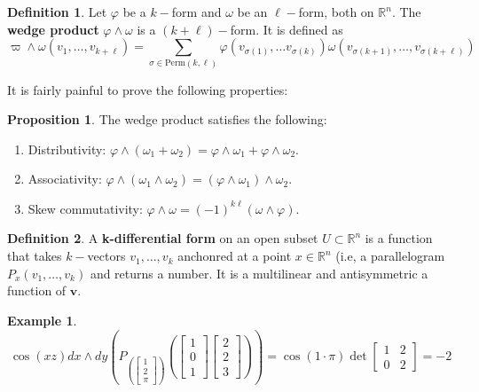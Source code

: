 \documentclass[10pt, oneside]{article}
\newcommand{\bbR}{\mathbb{R}}
\theoremstyle{definition}
\newtheorem{exmp}{Example}[section]
\newtheorem{defn}{Definition}
\newtheorem{prop}{Proposition}
\begin{document}
\begin{defn}
Let $\varphi$ be a $k-$form and $\omega$ be an $\ell-$form, both on $\bbR^n.$ The \textbf{wedge product} $\varphi \wedge \omega$ is a $(k + \ell)-$form. It is defined as 
\[\varpi \wedge \omega (v_1, \dots, v_{k+\ell}) = \sum_{\sigma \in \text{Perm}(k, \ell)} \varphi(v_{\sigma(1)}, \dots v_{\sigma(k)})\omega(v_{\sigma(k+1)}, \dots, v_{\sigma(k + \ell)})\]
\end{defn}
It is fairly painful to prove the following properties:
\begin{prop}
    The wedge product satisfies the following:
    \begin{enumerate}
        \item Distributivity: $\varphi \wedge(\omega_1 + \omega_2) = \varphi \wedge \omega_1 + \varphi \wedge \omega_2.$
        \item Associativity: $\varphi \wedge(\omega_1 \wedge \omega_2) = (\varphi \wedge \omega_1) \wedge \omega_2.$
        \item Skew commutativity: $\varphi \wedge \omega = (-1)^{k\ell}(\omega \wedge \varphi).$
    \end{enumerate}
\end{prop}

\begin{defn}
    A \textbf{k-differential form} on an open subset $U \subset \bbR^n$ is a function that takes $k-$vectors $v_1, \dots, v_k$ anchonred at a point $x\in \bbR^n$ (i.e, a parallelogram $P_x(v_1, \dots, v_k)$ and returns a number. It is a multilinear and antisymmetric a function of $\textbf{v}.$
\end{defn}
\begin{exmp}
    \[\cos(xz)dx \wedge dy\left(P_{\left(\begin{bmatrix}
        1 \\ 2\\ \pi
    \end{bmatrix}\right)}\left( \begin{bmatrix}
        1 \\ 0 \\ 1
    \end{bmatrix} \begin{bmatrix}
        2 \\ 2\\ 3
    \end{bmatrix}\right)\right) = \cos(1 \cdot \pi)\det\begin{bmatrix}
        1 & 2\\
        0 & 2
    \end{bmatrix} = -2\]
\end{exmp}
\end{document}
